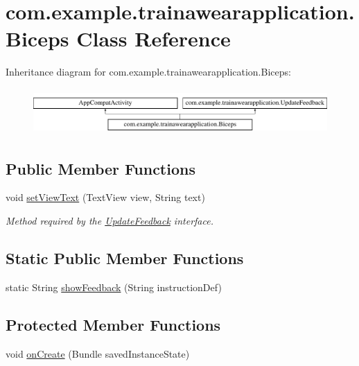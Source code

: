 \hypertarget{classcom_1_1example_1_1trainawearapplication_1_1_biceps}{}\section{com.\+example.\+trainawearapplication.\+Biceps Class Reference}
\label{classcom_1_1example_1_1trainawearapplication_1_1_biceps}
Inheritance diagram for com.\+example.\+trainawearapplication.\+Biceps\+:\begin{figure}[H]
\begin{center}
\leavevmode
\includegraphics[height=1.766562cm]{classcom_1_1example_1_1trainawearapplication_1_1_biceps}
\end{center}
\end{figure}
\subsection*{Public Member Functions}
\begin{DoxyCompactItemize}
\item 
void \mbox{\hyperlink{classcom_1_1example_1_1trainawearapplication_1_1_biceps_a6e1ab1b99cd05b29fb7346b0642b7d0e}{set\+View\+Text}} (Text\+View view, String text)
\begin{DoxyCompactList}\small\item\em Method required by the \mbox{\hyperlink{interfacecom_1_1example_1_1trainawearapplication_1_1_update_feedback}{Update\+Feedback}} interface. \end{DoxyCompactList}\end{DoxyCompactItemize}
\subsection*{Static Public Member Functions}
\begin{DoxyCompactItemize}
\item 
static String \mbox{\hyperlink{classcom_1_1example_1_1trainawearapplication_1_1_biceps_ad9e0fdf8309b31736b338a3b29079b24}{show\+Feedback}} (String instruction\+Def)
\end{DoxyCompactItemize}
\subsection*{Protected Member Functions}
\begin{DoxyCompactItemize}
\item 
void \mbox{\hyperlink{classcom_1_1example_1_1trainawearapplication_1_1_biceps_abcdfd60742e9da12033fad625275ca4f}{on\+Create}} (Bundle saved\+Instance\+State)
\end{DoxyCompactItemize}
